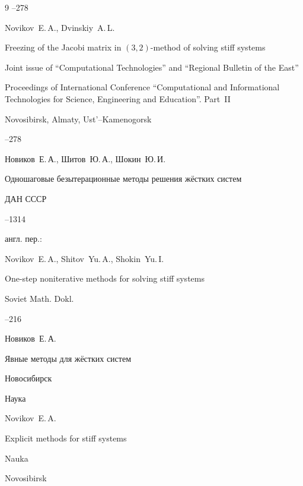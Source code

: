 \begin{thebibliography}{9}
--278

\misctransl

\by Novikov~E.\,A., Dvinskiy~A.\,L.

\paper Freezing of the Jacobi matrix in  $(3, 2)$-method of solving stiff systems

\inbook Joint issue of ``Computational Technologies'' and ``Regional Bulletin of the East''

\bookinfo Proceedings of International Conference ``Computational and Informational Technologies for Science, Engineering and Education''. Part~II

\publaddr Novosibirsk, Almaty, Ust'–Kamenogorsk


--278




\by Новиков~Е.\,А., Шитов~Ю.\,А., Шокин~Ю.\,И.

\paper Одношаговые безытерационные методы решения жёстких систем

\jour ДАН СССР




--1314

\transl англ. пер.:~

\by Novikov~E.\,A., Shitov~Yu.\,A., Shokin~Yu.\,I.

\paper One-step noniterative methods for solving stiff systems

\jour  Soviet Math. Dokl.




–216 




\by Новиков~Е.\,А.

\book Явные методы для жёстких систем

\publaddr Новосибирск

\publ Наука



\misctransl

\by Novikov~E.\,A.

\book Explicit methods for stiff systems

\publ Nauka

\publaddr Novosibirsk





\end{thebibliography}



\noindent

\hskip6.5cm \thedate \par\noindent

\hskip6.5cm\therevdate



\makeengtitle





\newpage



%

%

